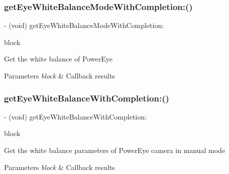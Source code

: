 \subsubsection{\texorpdfstring{get\+Eye\+White\+Balance\+Mode\+With\+Completion\+:()}{getEyeWhiteBalanceModeWithCompletion:()}}
{\footnotesize\ttfamily -\/ (void) get\+Eye\+White\+Balance\+Mode\+With\+Completion\+: \begin{DoxyParamCaption}\item[{(void($^\wedge$)(P\+V\+Eye\+Camera\+White\+Balance\+Mode white\+Balance\+Mode, N\+S\+Error $\ast$\hyperlink{group___p_v_s_d_k___c_o_r_e___a_p_i___m_o_u_n_t_c_o_n_t_r_o_l_ga5a1de33b230662127568783314b4a54d}{\+\_\+\+Nullable} error))}]{block }\end{DoxyParamCaption}}

Get the white balance of Power\+Eye


\begin{DoxyParams}{Parameters}
{\em block} & Callback results \\
\hline
\end{DoxyParams}
\mbox{\label{interface_p_v_camera_a6dbe18974bb0369fd79c24ddd46f73e4}} 
\subsubsection{\texorpdfstring{get\+Eye\+White\+Balance\+With\+Completion\+:()}{getEyeWhiteBalanceWithCompletion:()}}
{\footnotesize\ttfamily -\/ (void) get\+Eye\+White\+Balance\+With\+Completion\+: \begin{DoxyParamCaption}\item[{(void($^\wedge$)(N\+S\+Integer white\+Balance, N\+S\+Error $\ast$\hyperlink{group___p_v_s_d_k___c_o_r_e___a_p_i___m_o_u_n_t_c_o_n_t_r_o_l_ga5a1de33b230662127568783314b4a54d}{\+\_\+\+Nullable} error))}]{block }\end{DoxyParamCaption}}

Get the white balance parameters of Power\+Eye camera in manual mode


\begin{DoxyParams}{Parameters}
{\em block} & Callback results \\
\hline
\end{DoxyParams}
\mbox{\label{interface_p_v_camera_af38ef1f2833bf09a8f0e2d87dad820c9}} 
